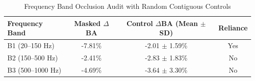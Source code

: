 \begin{table}[t]
\centering
\caption{Frequency Band Occlusion Audit with Random Contiguous Controls}
\label{tab:occlusion}
\begin{tabular}{lccc}
\toprule
\textbf{Frequency Band} & \textbf{Masked $\Delta$BA} & \textbf{Control $\Delta$BA (Mean $\pm$ SD)} & \textbf{Reliance} \\
\midrule
B1 (20--150 Hz)    & -7.81\% & -2.01 $\pm$ 1.59\% & Yes \\
B2 (150--500 Hz)   & -2.41\% & -2.83 $\pm$ 1.83\% & No \\
B3 (500--1000 Hz)  & -4.69\% & -3.64 $\pm$ 3.30\% & No \\
\bottomrule
\end{tabular}
\end{table}
